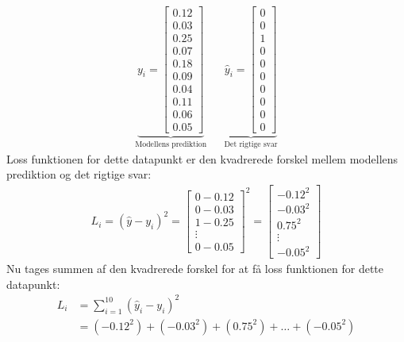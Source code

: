 \documentclass{article}
\begin{document}
\begin{align}
  \underbrace{y_i = \begin{bmatrix}
    0.12 \\
    0.03 \\
    0.25 \\
    0.07 \\
    0.18 \\
    0.09 \\
    0.04 \\
    0.11 \\
    0.06 \\
    0.05
  \end{bmatrix}}_{\text{Modellens prediktion}}
  &&
  \underbrace{\hat{y}_i = \begin{bmatrix}
    0 \\
    0 \\
    1 \\
    0 \\
    0 \\
    0 \\
    0 \\
    0 \\
    0 \\
    0
  \end{bmatrix}}_{\text{Det rigtige svar}}
\end{align}
Loss funktionen for dette datapunkt er den kvadrerede forskel mellem modellens prediktion og det rigtige svar:
\begin{align}
  L_i = (\hat{y} - y_i)^2 = \begin{bmatrix}
    0 - 0.12 \\
    0 - 0.03 \\
    1 - 0.25 \\
    \vdots \\
    0 - 0.05
  \end{bmatrix}^2 = \begin{bmatrix}
    -0.12^2 \\
    -0.03^2 \\
    0.75^2 \\
    \vdots \\
    -0.05^2
  \end{bmatrix}
\end{align}
Nu tages summen af den kvadrerede forskel for at få loss funktionen for dette datapunkt:
\begin{align}
  L_i &= \sum_{i=1}^{10} (\hat{y}_i - y_i)^2\\
      &= (-0.12^2) + (-0.03^2) + (0.75^2) + \ldots + (-0.05^2)
\end{align}
\end{document}
